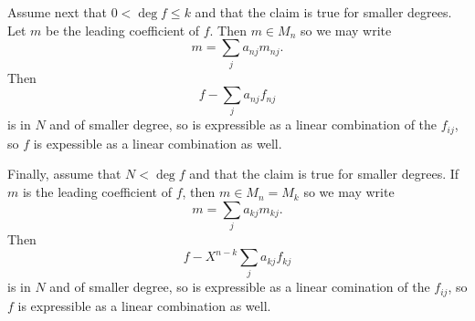 Assume next that $0 < \deg f\leq k$ and that the claim is true for smaller degrees.
Let $m$ be the leading coefficient of $f$. Then $m \in M_n$ so we may write
\[ m = \sum_j a_{nj}m_{nj}. \]
Then
\[ f - \sum_j a_{nj}f_{nj} \]
is in $N$ and of smaller degree, so is expressible as a linear combination of
the $f_{ij}$, so $f$ is expessible as a linear combination as well.

Finally, assume that $N < \deg f$ and that the claim is true for smaller degrees.
If $m$ is the leading coefficient of $f$, then $m \in M_n = M_k$ so we may write
\[ m = \sum_j a_{kj}m_{kj}. \]
Then
\[ f - X^{n-k}\sum_ja_{kj}f_{kj} \]
is in $N$ and of smaller degree, so is expressible as a linear comination of the
$f_{ij}$, so $f$ is expressible as a linear combination as well.
